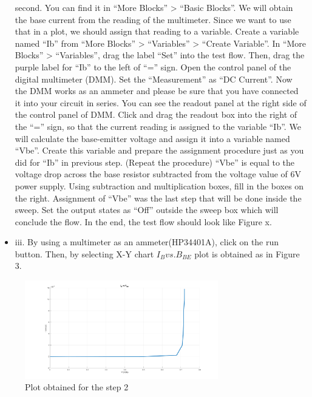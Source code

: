 \documentclass[letterpaper,12pt]{article}
\begin{document}
\begin{itemize}
    second. You can find it in “More Blocks” > “Basic Blocks”.
    We will obtain the base current from the reading of the multimeter. Since we want to
    use that in a plot, we should assign that reading to a variable. Create a variable named
    “Ib” from “More Blocks” > “Variables” > “Create Variable”.
    In “More Blocks” > “Variables”, drag the label “Set” into the test flow. Then, drag the
    purple label for “Ib” to the left of “=” sign.
    Open the control panel of the digital multimeter (DMM). Set the “Measurement” as
    “DC Current”. Now the DMM works as an ammeter and please be sure that you have
    connected it into your circuit in series.
    You can see the readout panel at the right side of the control panel of DMM. Click and
    drag the readout box into the right of the “=” sign, so that the current reading is assigned
    to the variable “Ib”.
    We will calculate the base-emitter voltage and assign it into a variable named “Vbe”.
    Create this variable and prepare the assignment procedure just as you did for “Ib” in previous step. (Repeat the procedure)
    “Vbe” is equal to the voltage drop across the base resistor subtracted from the voltage value
    of 6V power supply. Using subtraction and multiplication boxes, fill in the boxes on the right. 
    Assignment of “Vbe” was the last step that will be done inside the sweep. Set the output
    states as “Off” outside the sweep box which will conclude the flow.
    In the end, the test flow should look like Figure x.
    \item iii. By using a multimeter as an ammeter(HP34401A), click on the run button. Then, by selecting X-Y chart \(I_B vs. B_{BE}\) plot is obtained as in Figure 3.
\end{itemize}

\begin{figure}[H]
    \centering
    \includegraphics[width = 0.75\textwidth]{2_1.png}
    \caption{Plot obtained for the step 2}
\end{figure} 
\end{document}
